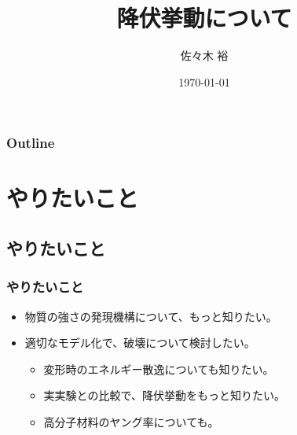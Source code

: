\documentclass[10pt, dvipdfmx]{beamer}
\title{降伏挙動について}
\author[東亞合成 佐々木]{佐々木 裕}
\institute[東亞合成]{東亞合成株式会社}
\date{\today}
\begin{document}
\maketitle

\begin{frame}
\frametitle{Outline}
\tableofcontents
\end{frame}

\section{やりたいこと}

\subsection{やりたいこと}

\begin{frame}
	\frametitle{やりたいこと}
	\Large
	\begin{itemize}
		\item 物質の強さの発現機構について、もっと知りたい。
		\item 適切なモデル化で、破壊について検討したい。
		\begin{itemize}
			\item 変形時のエネルギー散逸についても知りたい。
			\item 実実験との比較で、降伏挙動をもっと知りたい。
			\item 高分子材料のヤング率についても。
		\end{itemize}
	\end{itemize}
\end{frame}

\end{document}
